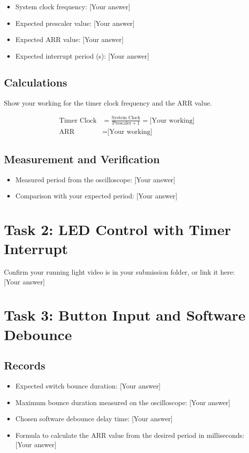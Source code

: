 \documentclass[11pt]{article}
\begin{document}
\begin{itemize}
    \item System clock frequency: [Your answer]
    \item Expected prescaler value: [Your answer]
    \item Expected ARR value: [Your answer]
    \item Expected interrupt period (s): [Your answer]
\end{itemize}

\subsection{Calculations}
Show your working for the timer clock frequency and the ARR value.

\begin{align*}
    \text{Timer Clock} &= \frac{\text{System Clock}}{\text{Prescaler} + 1} = \text{[Your working]} \\[2mm]
    \text{ARR} &= \text{[Your working]}
\end{align*}

\subsection{Measurement and Verification}
\begin{itemize}
    \item Measured period from the oscilloscope: [Your answer]
    \item Comparison with your expected period: [Your answer]
\end{itemize}

\section{Task 2: LED Control with Timer Interrupt}
Confirm your running light video is in your submission folder, or link it here: [Your answer]

\section{Task 3: Button Input and Software Debounce}

\subsection{Records}
\begin{itemize}
    \item Expected switch bounce duration: [Your answer]
    \item Maximum bounce duration measured on the oscilloscope: [Your answer]
    \item Chosen software debounce delay time: [Your answer]
    \item Formula to calculate the ARR value from the desired period in milliseconds: [Your answer]
\end{itemize}
\end{document}
